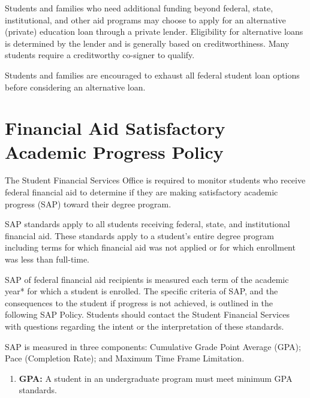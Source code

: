 \documentclass[
  letterpaper,
]{scrbook}
\providecommand{\tightlist}{%
  \setlength{\itemsep}{0pt}\setlength{\parskip}{0pt}}
\begin{document}
Students and families who need additional funding beyond federal, state,
institutional, and other aid programs may choose to apply for an
alternative (private) education loan through a private lender.
Eligibility for alternative loans is determined by the lender and is
generally based on creditworthiness. Many students require a
creditworthy co-signer to qualify.

Students and families are encouraged to exhaust all federal student loan
options before considering an alternative loan.

\section{\texorpdfstring{\textbf{Financial Aid Satisfactory Academic
Progress
Policy}}{Financial Aid Satisfactory Academic Progress Policy}}\label{financial-aid-satisfactory-academic-progress-policy}

The Student Financial Services Office is required to monitor students
who receive federal financial aid to determine if they are making
satisfactory academic progress (SAP) toward their degree program.

SAP standards apply to all students receiving federal, state, and
institutional financial aid. These standards apply to a student's entire
degree program including terms for which financial aid was not applied
or for which enrollment was less than full-time.

SAP of federal financial aid recipients is measured each term of the
academic year* for which a student is enrolled. The specific criteria of
SAP, and the consequences to the student if progress is not achieved, is
outlined in the following SAP Policy. Students should contact the
Student Financial Services with questions regarding the intent or the
interpretation of these standards.

SAP is measured in three components: Cumulative Grade Point Average
(GPA); Pace (Completion Rate); and Maximum Time Frame Limitation.

\begin{enumerate}
\def\labelenumi{\arabic{enumi}.}
\tightlist
\item
  \textbf{GPA:} A student in an undergraduate program must meet minimum
  GPA standards.
\end{enumerate}
\end{document}
